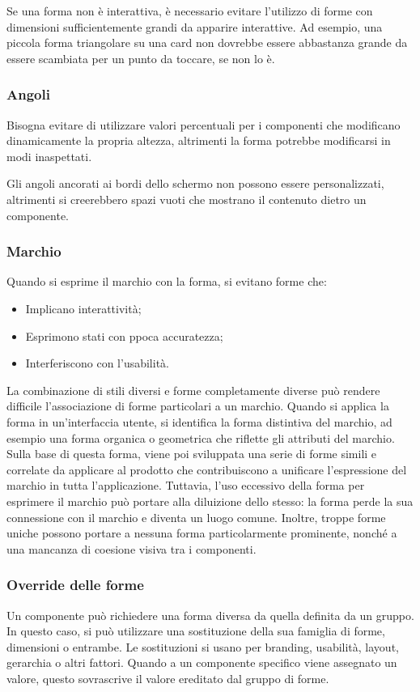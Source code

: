 \documentclass[12pt, a4paper]{report}
\begin{document}
	Se una forma non è interattiva, è necessario evitare l'utilizzo di forme con dimensioni sufficientemente grandi da apparire interattive. Ad esempio, una piccola forma triangolare su una card non dovrebbe essere abbastanza grande da essere scambiata per un punto da toccare, se non lo è.

	\subsubsection{Angoli}
	Bisogna evitare di utilizzare valori percentuali per i componenti che modificano dinamicamente la propria altezza, altrimenti la forma potrebbe modificarsi in modi inaspettati.

	Gli angoli ancorati ai bordi dello schermo non possono essere personalizzati, altrimenti si creerebbero spazi vuoti che mostrano il contenuto dietro un componente.

	\subsubsection{Marchio}
	Quando si esprime il marchio con la forma, si evitano forme che:
	\begin{itemize}
		\item Implicano interattività;
		\item Esprimono stati con ppoca accuratezza;
		\item Interferiscono con l'usabilità.
	\end{itemize}
	La combinazione di stili diversi e forme completamente diverse può rendere difficile l'associazione di forme particolari a un marchio. Quando si applica la forma in un'interfaccia utente, si identifica la forma distintiva del marchio, ad esempio una forma organica o geometrica che riflette
	gli attributi del marchio. Sulla base di questa forma,  viene poi sviluppata una serie di forme simili e correlate da applicare al prodotto che contribuiscono a unificare l'espressione del marchio in tutta l'applicazione. Tuttavia, l'uso eccessivo della forma per esprimere il marchio può portare
	alla diluizione dello stesso: la forma perde la sua connessione con il marchio e diventa un luogo comune. Inoltre, troppe forme uniche possono portare a nessuna forma particolarmente prominente, nonché a una mancanza di coesione visiva tra i componenti.

	\subsubsection{Override delle forme}
	Un componente può richiedere una forma diversa da quella definita da un gruppo. In questo caso, si può utilizzare una sostituzione della sua famiglia di forme, dimensioni o entrambe. Le sostituzioni si usano per branding, usabilità, layout, gerarchia o altri fattori.
	Quando a un componente specifico viene assegnato un valore, questo sovrascrive il valore ereditato dal gruppo di forme.
\end{document}
